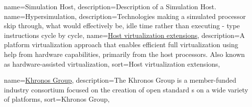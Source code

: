 {
  name={Simulation Host},
  description={Description of a Simulation Host.}
}
\newcommand{\dvttermhost}{\dvtcmdcaponcegloss{dvtglosshost}{Host}}
\newcommand{\dvttermhewlettpackard}{Hewlett-Packard Company}
\newcommand{\dvttermhoneywell}{Honeywell International, Inc.}
{
  name={Hypersimulation},
  description={Technologies making a simulated processor skip through, what would effectively be, idle time rather than executing - type instructions cycle by cycle},
}
\newcommand{\dvttermhypersimulation}{\dvtcmdcaponcegloss{dvtglosshypersimulation}{Hypersimulation}}
{
  name={\href{http://en.wikipedia.org/wiki/Hardware-assisted_virtualization}{Host virtualization extensions}},
  description={A platform virtualization approach that enables efficient full virtualization using help from hardware capabilities, primarily from the host processors. Also known as hardware-assisted virtualization},
  sort={Host virtualization extensions},
}
\newcommand{\dvttermhostvirtualizationextensions}{\dvtcmdcaponcegloss{dvtglosshostvirtualizationextensions}{Host Virtualization Extensions}}
\newcommand{\dvttermhaxm}{\dvttermintel\ \dvtcmdabbrev{dvtglosshaxm}}

\newcommand{\dvtterminterpretation}{\dvtcmdcaponce{Interpretation}}
\newcommand{\dvttermintel}{Intel\circledR}
\newcommand{\dvttermintelcoreiseven}{\dvttermintel\ Core\texttrademark\ i7}
\newcommand{\dvttermibm}{IBM}
\newcommand{\dvttermisa}{\dvtcmdabbrev{dvtglossisa}}

\newcommand{\dvttermjit}{\dvtcmdabbrev{dvtglossjit}}
\newcommand{\dvttermjni}{\dvtcmdabbrev{dvtglossjni}}

{
  name={\href{http://en.wikipedia.org/wiki/Khronos_Group}{Khronos Group}},
  description={The Khronos Group is a member-funded industry consortium focused on the creation of open standard \dvttermapi s on a wide variety of platforms},
  sort={Khronos Group},
}
\newcommand{\dvttermkhronos}{\glslink{dvtglosskhronos}{Khronos}}
\newcommand{\dvttermkvm}{\dvtcmdabbrev{dvtglosskvm}}

